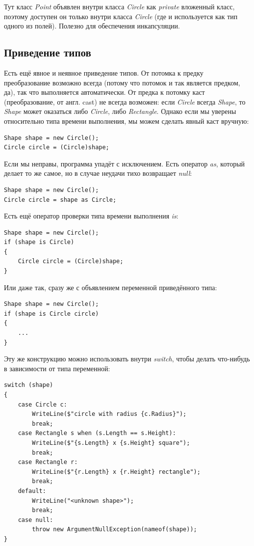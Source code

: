 \documentclass{../../text-style}
\begin{document}
Тут класс \textit{Point} объявлен внутри класса \textit{Circle} как \textit{private} вложенный класс, поэтому доступен он только внутри класса \textit{Circle} (где и используется как тип одного из полей). Полезно для обеспечения инкапсуляции.

\subsection{Приведение типов}

Есть ещё явное и неявное приведение типов. От потомка к предку преобразование возможно всегда (потому что потомок и так является предком, да), так что выполняется автоматически. От предка к потомку каст (преобразование, от англ. cast) не всегда возможен: если \textit{Circle} всегда \textit{Shape}, то \textit{Shape} может оказаться либо \textit{Circle}, либо \textit{Rectangle}. Однако если мы уверены относительно типа времени выполнения, мы можем сделать явный каст вручную: 

\begin{verbatim}
Shape shape = new Circle();
Circle circle = (Circle)shape;
\end{verbatim}

Если мы неправы, программа упадёт с исключением. Есть оператор \textit{as}, который делает то же самое, но в случае неудачи тихо возвращает \textit{null}:

\begin{verbatim}
Shape shape = new Circle();
Circle circle = shape as Circle;
\end{verbatim}

Есть ещё оператор проверки типа времени выполнения \textit{is}:

\begin{verbatim}
Shape shape = new Circle();
if (shape is Circle) 
{
    Circle circle = (Circle)shape;
}
\end{verbatim}

Или даже так, сразу же с объявлением переменной приведённого типа:

\begin{verbatim}
Shape shape = new Circle();
if (shape is Circle circle) 
{
    ...
}
\end{verbatim}

Эту же конструкцию можно использовать внутри \textit{switch}, чтобы делать что-нибудь в зависимости от типа переменной:

\begin{verbatim}
switch (shape)
{
    case Circle c:
        WriteLine($"circle with radius {c.Radius}");
        break;
    case Rectangle s when (s.Length == s.Height):
        WriteLine($"{s.Length} x {s.Height} square");
        break;
    case Rectangle r:
        WriteLine($"{r.Length} x {r.Height} rectangle");
        break;
    default:
        WriteLine("<unknown shape>");
        break;
    case null:
        throw new ArgumentNullException(nameof(shape));
}
\end{verbatim}
\end{document}
